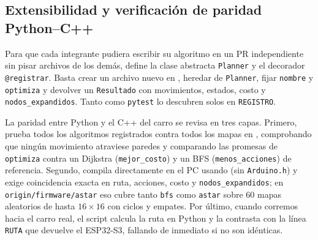 \subsection{Extensibilidad y verificación de paridad Python--C++}
\label{subsec:extensibilidad-paridad}

Para que cada integrante pudiera escribir su algoritmo en un PR independiente sin pisar archivos de los demás,  define la clase abstracta \texttt{Planner} y el decorador \texttt{@registrar}. Basta crear un archivo nuevo en , heredar de \texttt{Planner}, fijar \texttt{nombre} y \texttt{optimiza} y devolver un \texttt{Resultado} con movimientos, estados, costo y \texttt{nodos\_expandidos}. Tanto  como \texttt{pytest} lo descubren solos en \texttt{REGISTRO}.

La paridad entre Python y el C++ del carro se revisa en tres capas. Primero,  prueba todos los algoritmos registrados contra todos los mapas en , comprobando que ningún movimiento atraviese paredes y comparando las promesas de \texttt{optimiza} contra un Dijkstra (\texttt{mejor\_costo}) y un BFS (\texttt{menos\_acciones}) de referencia. Segundo,  compila directamente  en el PC usando  (sin \texttt{Arduino.h}) y exige coincidencia exacta en ruta, acciones, costo y \texttt{nodos\_expandidos}; en \texttt{origin/\allowbreak firmware/\allowbreak astar} eso cubre tanto \texttt{bfs} como \texttt{astar} sobre $60$ mapas aleatorios de hasta $16 \times 16$ con ciclos y empates. Por último, cuando corremos  hacia el carro real, el script calcula la ruta en Python y la contrasta con la línea \texttt{RUTA} que devuelve el ESP32-S3, fallando de inmediato si no son idénticas.
